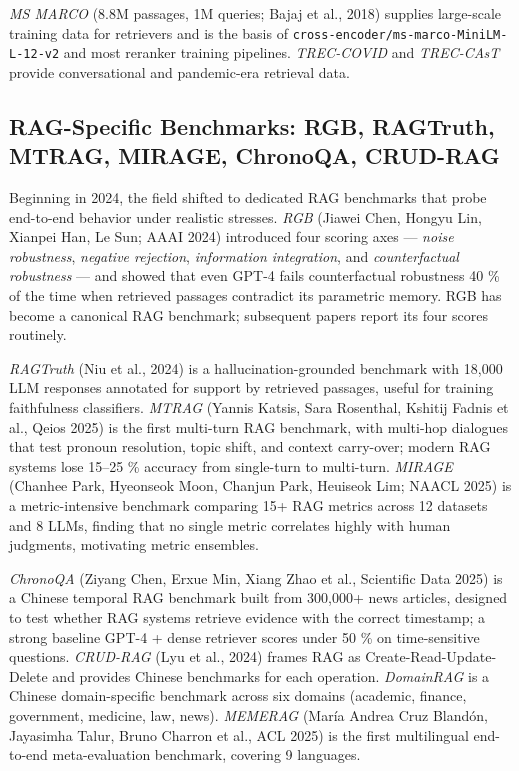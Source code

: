 \documentclass{article}
\begin{document}
\emph{MS MARCO} (8.8M passages, 1M queries; Bajaj et al., 2018) supplies large-scale training data for retrievers and is the basis of \texttt{cross-encoder/ms-marco-MiniLM-L-12-v2} and most reranker training pipelines. \emph{TREC-COVID} and \emph{TREC-CAsT} provide conversational and pandemic-era retrieval data.

\subsection{RAG-Specific Benchmarks: RGB, RAGTruth, MTRAG, MIRAGE, ChronoQA, CRUD-RAG}\label{rag-specific-benchmarks-rgb-ragtruth-mtrag-mirage-chronoqa-crud-rag}

Beginning in 2024, the field shifted to dedicated RAG benchmarks that probe end-to-end behavior under realistic stresses. \emph{RGB} (Jiawei Chen, Hongyu Lin, Xianpei Han, Le Sun; AAAI 2024) introduced four scoring axes --- \emph{noise robustness}, \emph{negative rejection}, \emph{information integration}, and \emph{counterfactual robustness} --- and showed that even GPT-4 fails counterfactual robustness 40 \% of the time when retrieved passages contradict its parametric memory. RGB has become a canonical RAG benchmark; subsequent papers report its four scores routinely.

\emph{RAGTruth} (Niu et al., 2024) is a hallucination-grounded benchmark with 18,000 LLM responses annotated for support by retrieved passages, useful for training faithfulness classifiers. \emph{MTRAG} (Yannis Katsis, Sara Rosenthal, Kshitij Fadnis et al., Qeios 2025) is the first multi-turn RAG benchmark, with multi-hop dialogues that test pronoun resolution, topic shift, and context carry-over; modern RAG systems lose 15--25 \% accuracy from single-turn to multi-turn. \emph{MIRAGE} (Chanhee Park, Hyeonseok Moon, Chanjun Park, Heuiseok Lim; NAACL 2025) is a metric-intensive benchmark comparing 15+ RAG metrics across 12 datasets and 8 LLMs, finding that no single metric correlates highly with human judgments, motivating metric ensembles.

\emph{ChronoQA} (Ziyang Chen, Erxue Min, Xiang Zhao et al., Scientific Data 2025) is a Chinese temporal RAG benchmark built from 300,000+ news articles, designed to test whether RAG systems retrieve evidence with the correct timestamp; a strong baseline GPT-4 + dense retriever scores under 50 \% on time-sensitive questions. \emph{CRUD-RAG} (Lyu et al., 2024) frames RAG as Create-Read-Update-Delete and provides Chinese benchmarks for each operation. \emph{DomainRAG} \citep{wang20242024} is a Chinese domain-specific benchmark across six domains (academic, finance, government, medicine, law, news). \emph{MEMERAG} (María Andrea Cruz Blandón, Jayasimha Talur, Bruno Charron et al., ACL 2025) is the first multilingual end-to-end meta-evaluation benchmark, covering 9 languages.
\end{document}

